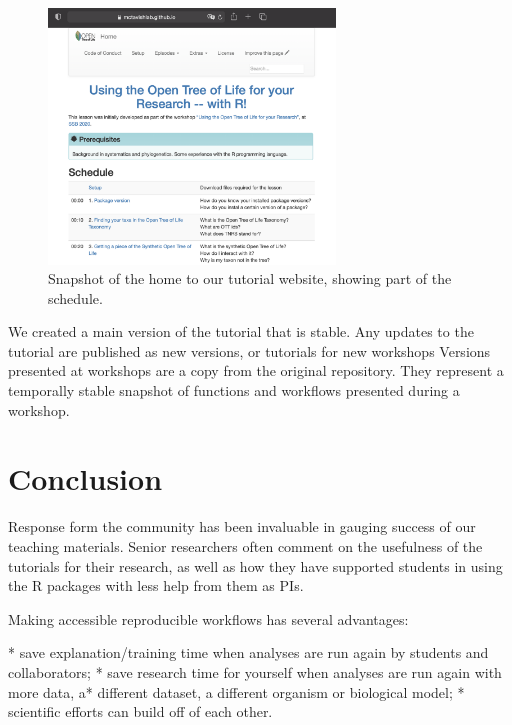\documentclass[12pt]{article}
\begin{document}
\begin{figure}
\begin{center}
\includegraphics[width=3in]{fig-schedule.png}
\end{center}
\caption{Snapshot of the home to our tutorial website, showing part of the schedule. \label{fig:schedule}}
\end{figure}

We created a main version of the tutorial that is stable. Any updates to the tutorial are
published as new versions, or tutorials for new workshops \citep{wilson2006swc, SWCwebsite}
 Versions presented at workshops are a copy from the original repository.
They represent a temporally stable snapshot of functions and workflows presented
during a workshop.


\section*{Conclusion}
\label{sec:conclusion}

Response form the community has been invaluable in gauging success of our teaching
materials.
Senior researchers often comment on the usefulness
of the tutorials for their research, as well as how they have supported students in using the
R packages with less help from them as PIs.

Making accessible reproducible workflows has several advantages:

* save explanation/training time when analyses are run again by students and collaborators;
* save research time for yourself when analyses are run again with more data, a* different dataset, a different organism or biological model;
* scientific efforts can build off of each other.
\end{document}

